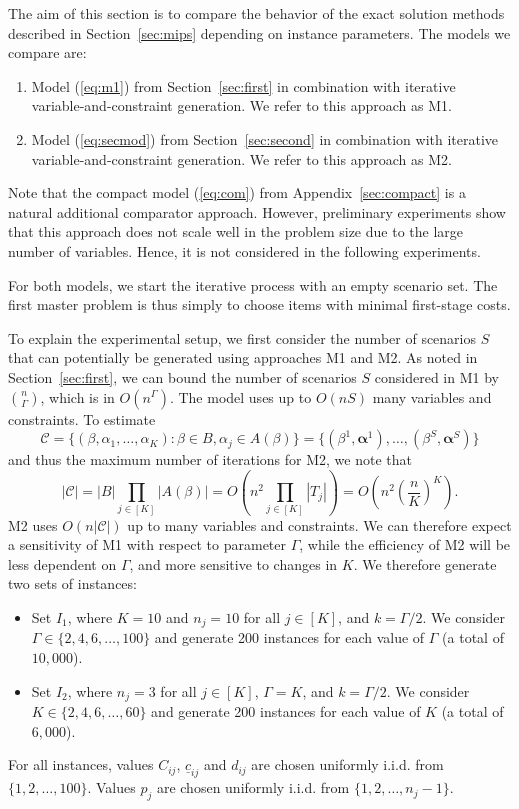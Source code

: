 \documentclass[a4paper,11pt,abstracton]{scrartcl}
\theoremstyle{definition}
\theoremstyle{remark}
\begin{document}
The aim of this section is to compare the behavior of the exact solution methods described in Section~\ref{sec:mips} depending on instance parameters. The models we compare are:
\begin{enumerate}
\item Model (\ref{eq:m1}) from Section~\ref{sec:first} in combination with iterative variable-and-constraint generation. We refer to this approach as M1.
\item Model (\ref{eq:secmod}) from Section~\ref{sec:second} in combination with iterative variable-and-constraint generation. We refer to this approach as M2.
\end{enumerate}
Note that the compact model (\ref{eq:com}) from Appendix~\ref{sec:compact} is a natural additional comparator approach. However, preliminary experiments show that this approach does not scale well in the problem size due to the large number of variables. Hence, it is not considered in the following experiments.

For both models, we start the iterative process with an empty scenario set. The first master problem is thus simply to choose items with minimal first-stage costs.

To explain the experimental setup, we first consider the number of scenarios $S$ that can potentially be generated using approaches M1 and M2. As noted in Section~\ref{sec:first}, we can bound the number of scenarios $S$ considered in M1 by $\binom{n}{\Gamma}$, which is in $O(n^\Gamma)$. The model uses up to $O(nS)$ many variables and constraints. To estimate
\[ \mathcal{C} = \{ (\beta,\alpha_1,\ldots,\alpha_K) : \beta \in B, \alpha_j \in A(\beta) \} =  \{ (\beta^1,\pmb{\alpha}^1), \ldots, (\beta^S,\pmb{\alpha}^S) \} \]
and thus the maximum number of iterations for M2, we note that
\[ |\mathcal{C}| = |B| \prod_{j\in[K]} |A(\beta)| = O(n^2 \prod_{j\in[K]} |T_j|) = O(n^2\left(\frac{n}{K}\right)^K ). \]
M2 uses $O(n|\mathcal{C}|)$ up to many variables and constraints.
We can therefore expect a sensitivity of M1 with respect to parameter $\Gamma$, while the efficiency of M2 will be less dependent on $\Gamma$, and more sensitive to changes in $K$. We therefore generate two sets of instances:
\begin{itemize}
\item Set $I_1$, where $K=10$ and $n_j=10$ for all $j\in[K]$, and $k=\Gamma/2$. We consider $\Gamma\in \{2,4,6,\ldots,100\}$ and generate 200 instances for each value of $\Gamma$ (a total of $10,000$).

\item Set $I_2$, where $n_j=3$ for all $j\in[K]$, $\Gamma=K$, and $k=\Gamma/2$. We consider $K\in \{2,4,6,\ldots,60\}$ and generate 200 instances for each value of $K$ (a total of $6,000$).
\end{itemize}
For all instances, values $C_{ij}$, $\underline{c}_{ij}$ and $d_{ij}$ are chosen uniformly i.i.d.\! from $\{1,2,\ldots,100\}$. Values $p_j$ are chosen uniformly i.i.d.\! from $\{1,2,\ldots,n_j-1\}$.
\end{document}
